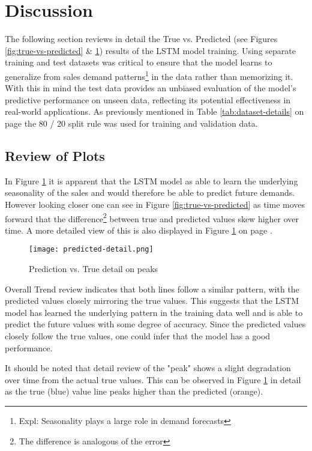 \documentclass[10pt, conference, compsoc]{IEEEtran}
\begin{document}
\section{Discussion}
The following section reviews in detail the True vs. Predicted (see Figures \ref{fig:true-vs-predicted} \& \ref{fig:prediction-detail}) results of the LSTM model training. Using separate training and test datasets was critical to ensure that the model learns to generalize from sales demand patterns\footnote{Expl: Seasonality plays a large role in demand forecasts} in the data rather than memorizing it. With this in mind the test data provides an unbiased evaluation of the model's predictive performance on unseen data, reflecting its potential effectiveness in real-world applications. As previously mentioned in Table \ref{tab:dataset-details} on page \pageref{tab:dataset-details} the 80 / 20 split rule was used for training and validation data.

\subsection{Review of Plots}
In Figure \ref{fig:prediction-detail} it is apparent that the LSTM model as able to learn the underlying seasonality of the sales and would therefore be able to predict future demands. However looking closer one can see in Figure \ref{fig:true-vs-predicted} as time moves forward that the difference\footnote{The difference is analogous of the error} between true and predicted values skew higher over time. A more detailed view of this is also displayed in Figure \ref{fig:prediction-detail} on page \pageref{fig:prediction-detail}. 

\begin{figure}[h]
\centering
\captionsetup{justification=centering,margin=1cm}
\texttt{[image: predicted-detail.png]}
\caption{Prediction vs. True detail on peaks}
\label{fig:prediction-detail}
\end{figure}

Overall Trend review indicates that both lines follow a similar pattern, with the predicted values closely mirroring the true values. This suggests that the LSTM model has learned the underlying pattern in the training data well and is able to predict the future values with some degree of accuracy. Since the predicted values closely follow the true values, one could infer that the model has a good performance. 

It should be noted that detail review of the "peak" shows a slight degradation over time from the actual true values. This can be observed in Figure \ref{fig:prediction-detail} in detail as the true (blue) value line peaks higher than the predicted (orange).
\end{document}
